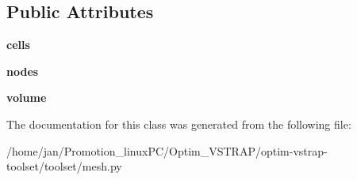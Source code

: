 \subsection*{Public Attributes}
\begin{DoxyCompactItemize}
\item 
\mbox{\label{classmesh_1_1Mesh_aae2a3fbf55b22d4bccd0ce83cc11be57}} 
{\bfseries cells}
\item 
\mbox{\label{classmesh_1_1Mesh_a22bcb6ef348b8291241cd95c27e1ba66}} 
{\bfseries nodes}
\item 
\mbox{\label{classmesh_1_1Mesh_a101a440d5b02561a06dde8662cf69f54}} 
{\bfseries volume}
\end{DoxyCompactItemize}


The documentation for this class was generated from the following file\+:\begin{DoxyCompactItemize}
\item 
/home/jan/\+Promotion\+\_\+linux\+P\+C/\+Optim\+\_\+\+V\+S\+T\+R\+A\+P/optim-\/vstrap-\/toolset/toolset/mesh.\+py\end{DoxyCompactItemize}
